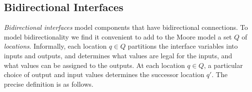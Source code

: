 \subsection{Bidirectional Interfaces}

{\em Bidirectional interfaces\/} %
model components that have bidirectional connections. 
To model bidirectionality we find it convenient to add to the Moore model
a set $Q$ of {\em locations}.
Informally, each location $q \in Q$ partitions the interface variables 
into inputs and outputs, and determines what values are legal for 
the inputs, and what values can be assigned to the outputs. 
At each location $q \in Q$, a particular choice of output and input 
values determines the successor location $q'$. 
The precise definition is as follows. 

